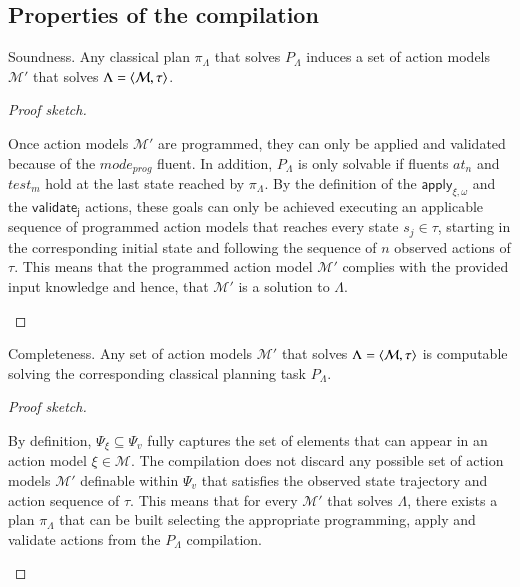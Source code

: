 \subsection{Properties of the compilation}
\label{properties}


\begin{mylemma}
Soundness. Any classical plan $\pi_\Lambda$ that solves $P_{\Lambda}$ induces a set of action models $\mathcal{M}'$ that solves $\Lambda={\langle \mathcal{M},\tau \rangle}$.
\end{mylemma}

\begin{proof}[Proof sketch]
\begin{small}
  Once action models $\mathcal{M}'$ are programmed, they can only be applied and validated because of the $mode_{prog}$ fluent. In addition, $P_{\Lambda}$ is only solvable if fluents {\tt\small $at_n$} and {\tt\small $test_m$} hold at the last state reached by $\pi_\Lambda$. By the definition of the $\mathsf{apply_{\xi,\omega}}$ and the $\mathsf{validate_{j}}$ actions, these goals can only be achieved executing an applicable sequence of programmed action models that reaches every state $s_j\in\tau$, starting in the corresponding initial state and following the sequence of $n$ observed actions of $\tau$. This means that the programmed action model $\mathcal{M}'$ complies with the provided input knowledge and hence, that $\mathcal{M}'$ is a solution to $\Lambda$.
\end{small}
\end{proof}


\begin{mylemma}
Completeness. Any set of action models $\mathcal{M}'$ that solves $\Lambda={\langle \mathcal{M},\tau \rangle}$ is computable solving the corresponding classical planning task $P_{\Lambda}$.
\end{mylemma}

\begin{proof}[Proof sketch]
\begin{small}
  By definition, $\Psi_{\xi}\subseteq \Psi_v$ fully captures the set of elements that can appear in an action model $\xi\in\mathcal{M}$. The compilation does not discard any possible set of action models $\mathcal{M}'$ definable within $\Psi_v$ that satisfies the observed state trajectory and action sequence of $\tau$. This means that for every $\mathcal{M}'$ that solves $\Lambda$, there exists a plan $\pi_\Lambda$ that can be built selecting the appropriate programming, apply and validate actions from the $P_{\Lambda}$ compilation.
\end{small}
\end{proof}

